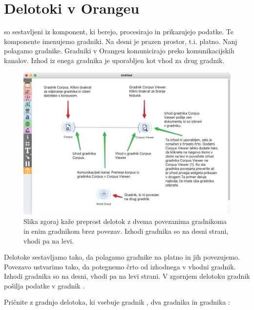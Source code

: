 \chapter{Delotoki v Orangeu}
\label{ch:workflows}

 so sestavljeni iz komponent, ki berejo, procesirajo in prikazujejo podatke. Te komponente imenujemo gradniki. Na desni je prazen prostor, t.i. platno. Nanj polagamo gradnike. Gradniki v Orangeu komunicirajo preko komunikacijskih kanalov. Izhod iz enega gradnika je uporabljen kot vhod za drug gradnik.

\begin{figure}[h]
  \includegraphics[width=\linewidth]{workflow-fig1.png}%
  \caption{Slika zgoraj kaže preprost delotok z dvema povezanima gradnikoma in enim gradnikom brez povezav. Izhodi gradnika so na desni strani, vhodi pa na levi.}
  \label{fig:workflow-fig1}
\end{figure}

Delotoke sestavljamo tako, da polagamo gradnike na platno in jih povezujemo. Povezavo ustvarimo tako, da potegnemo črto od izhodnega v vhodni gradnik. Izhodi gradnika so na desni, vhodi pa na levi strani. V zgornjem delotoku gradnik  pošilja podatke v gradnik .

\newpage

Pričnite z gradnjo delotoka, ki vsebuje gradnik , dva gradnika  in gradnika :

